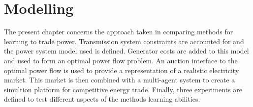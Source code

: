 \chapter{Modelling}
\label{ch:method}
The present chapter concerns the approach taken in comparing methods for
learning to trade power.  Transmission system constraints are accounted for and
the power system model used is defined.  Generator costs are added to this
model and used to form an optimal power flow problem.  An auction interface to
the optimal power flow is used to provide a representation of a realistic
electricity market.  This market is then combined with a multi-agent system to
create a simultion platform for competitive energy trade.  Finally, three
experiments are defined to test different aspects of the methods learning
abilities.

%
%
